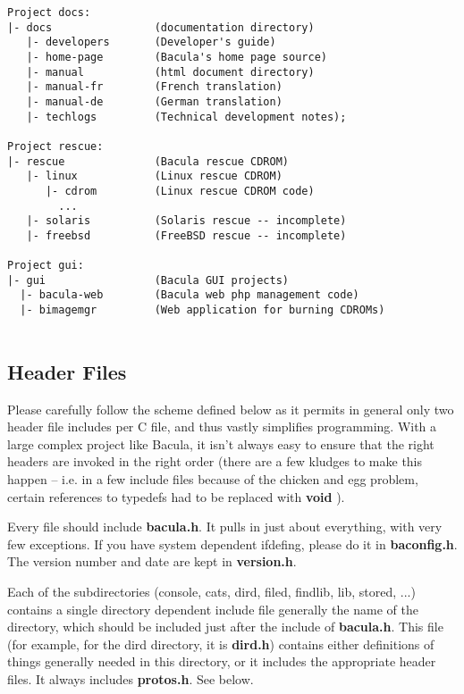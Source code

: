 \begin{verbatim}
Project docs:
|- docs                (documentation directory)
   |- developers       (Developer's guide)
   |- home-page        (Bacula's home page source)
   |- manual           (html document directory)
   |- manual-fr        (French translation) 
   |- manual-de        (German translation) 
   |- techlogs         (Technical development notes);

Project rescue:
|- rescue              (Bacula rescue CDROM)
   |- linux            (Linux rescue CDROM)
      |- cdrom         (Linux rescue CDROM code)
        ...
   |- solaris          (Solaris rescue -- incomplete) 
   |- freebsd          (FreeBSD rescue -- incomplete)

Project gui:
|- gui                 (Bacula GUI projects)
  |- bacula-web        (Bacula web php management code)
  |- bimagemgr         (Web application for burning CDROMs)


\end{verbatim}
\normalsize

\subsection{Header Files}

Please carefully follow the scheme defined below as it permits in general only
two header file includes per C file, and thus vastly simplifies programming.
With a large complex project like Bacula, it isn't always easy to ensure that
the right headers are invoked in the right order (there are a few kludges to
make this happen -- i.e. in a few include files because of the chicken and egg
problem, certain references to typedefs had to be replaced with {\bf void} ). 

Every file should include {\bf bacula.h}. It pulls in just about everything,
with very few exceptions. If you have system dependent ifdefing, please do it
in {\bf baconfig.h}. The version number and date are kept in {\bf version.h}. 

Each of the subdirectories (console, cats, dird, filed, findlib, lib, stored,
...) contains a single directory dependent include file generally the name of
the directory, which should be included just after the include of {\bf
bacula.h}. This file (for example, for the dird directory, it is {\bf dird.h})
contains either definitions of things generally needed in this directory, or
it includes the appropriate header files. It always includes {\bf protos.h}.
See below. 

